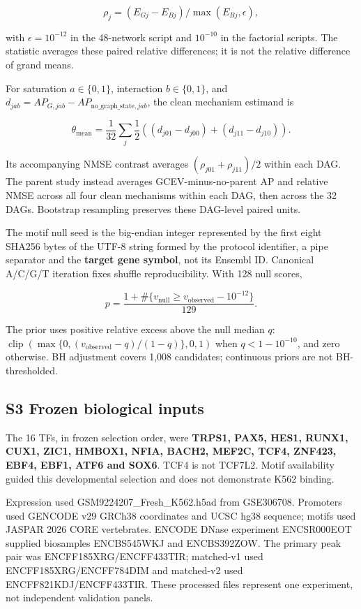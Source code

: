 \documentclass[
  11pt,
]{article}
\begin{document}
\[
\rho_j=(E_{Gj}-E_{Bj})/\max(E_{Bj},\epsilon),
\]

with \(\epsilon=10^{-12}\) in the 48-network script and \(10^{-10}\) in
the factorial scripts. The statistic averages these paired relative
differences; it is not the relative difference of grand means.

For saturation \(a\in\{0,1\}\), interaction \(b\in\{0,1\}\), and
\(d_{jab}=AP_{G,jab}-AP_{\mathrm{no\_graph\_state},jab}\), the clean
mechanism estimand is

\[
\theta_{\mathrm{mean}}=\frac1{32}\sum_j\frac12
\left((d_{j01}-d_{j00})+(d_{j11}-d_{j10})\right).
\]

Its accompanying NMSE contrast averages \((\rho_{j01}+\rho_{j11})/2\)
within each DAG. The parent study instead averages GCEV-minus-no-parent
AP and relative NMSE across all four clean mechanisms within each DAG,
then across the 32 DAGs. Bootstrap resampling preserves these DAG-level
paired units.

The motif null seed is the big-endian integer represented by the first
eight SHA256 bytes of the UTF-8 string formed by the protocol
identifier, a pipe separator and the \textbf{target gene symbol}, not
its Ensembl ID. Canonical A/C/G/T iteration fixes shuffle
reproducibility. With 128 null scores,

\[
p=\frac{1+\#\{v_{\mathrm{null}}\ge v_{\mathrm{observed}}-10^{-12}\}}{129}.
\]

The prior uses positive relative excess above the null median \(q\):
\(\operatorname{clip}(\max\{0,(v_{\mathrm{observed}}-q)/(1-q)\},0,1)\)
when \(q<1-10^{-10}\), and zero otherwise. BH adjustment covers 1,008
candidates; continuous priors are not BH-thresholded.

\subsection{S3 Frozen biological
inputs}\label{s3-frozen-biological-inputs}

The 16 TFs, in frozen selection order, were \textbf{TRPS1, PAX5, HES1,
RUNX1, CUX1, ZIC1, HMBOX1, NFIA, BACH2, MEF2C, TCF4, ZNF423, EBF4, EBF1,
ATF6 and SOX6}. TCF4 is not TCF7L2. Motif availability guided this
developmental selection and does not demonstrate K562 binding.

Expression used GSM9224207\_Fresh\_K562.h5ad from GSE306708. Promoters
used GENCODE v29 GRCh38 coordinates and UCSC hg38 sequence; motifs used
JASPAR 2026 CORE vertebrates. ENCODE DNase experiment ENCSR000EOT
supplied biosamples ENCBS545WKJ and ENCBS392ZOW. The primary peak pair
was ENCFF185XRG/ENCFF433TIR; matched-v1 used ENCFF185XRG/ENCFF784DIM and
matched-v2 used ENCFF821KDJ/ENCFF433TIR. These processed files represent
one experiment, not independent validation panels.
\end{document}
